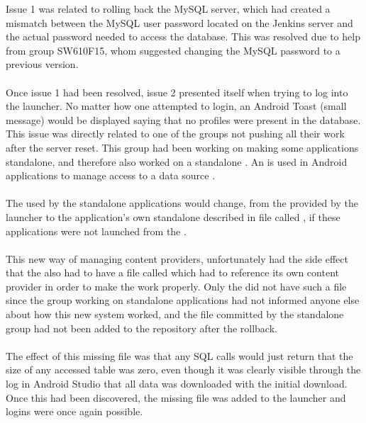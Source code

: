 Issue 1 was related to rolling back the MySQL server, which had created a mismatch between the MySQL user password located on the Jenkins server and the actual password needed to access the database. This was resolved due to help from group SW610F15, whom suggested changing the MySQL password to a previous version.
\\\\
Once issue 1 had been resolved, issue 2 presented itself when trying to log into the \giraf launcher. No matter how one attempted to login, an Android Toast (small message) would be displayed saying that no profiles were present in the database. This issue was directly related to one of the groups not pushing all their work after the server reset. This group had been working on making some applications standalone, and therefore also worked on a standalone . An  is used in Android applications to manage access to a data source \parencite{android_content_provider}. 
\\\\
The  used by the standalone applications would change, from the  provided by the launcher to the application's own standalone  described in file called , if these applications were not launched from the \giraf \launcher. 
\\\\
This new way of managing content providers, unfortunately had the side effect that the \giraf \launcher also had to have a file called  which had to reference its own content provider in order to make the \giraf \launcher work properly. Only the \giraf \launcher did not have such a file since the group working on standalone applications had not informed anyone else about how this new system worked, and the file committed by the standalone group had not been added to the \giraf \launcher repository after the rollback. 
\\\\
The effect of this missing file was that any SQL calls would just return that the size of any accessed table was zero, even though it was clearly visible through the log in Android Studio that all data was downloaded with the initial download. Once this had been discovered, the missing  file was added to the launcher and logins were once again possible.
